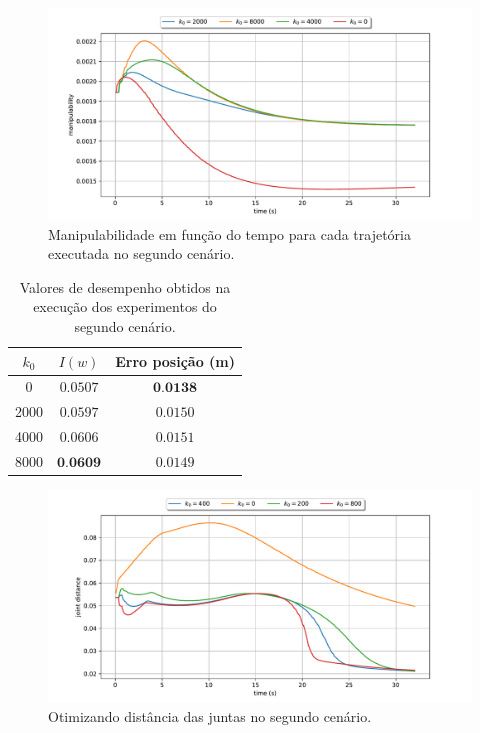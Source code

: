 \begin{figure}
	\centering
	\includegraphics[width=\textwidth]{./Images/2024-06-11-09-17-48/metric_manipulability.pdf}
	\caption{Manipulabilidade em função do tempo para cada trajetória executada no segundo cenário.}\label{fig:exp2-metric}
\end{figure}

\begin{table}[htbp]
    \centering
    \begin{tabular}{ccc}
        \toprule
        \( k_0 \) & \( I(w) \)  & Erro posição (m) \\
        \midrule
        0  & \( 0.0507 \) & \( \textbf{0.0138} \) \\
        2000  & \( 0.0597 \) & \( 0.0150 \) \\
        4000  & \( 0.0606 \) & \( 0.0151 \) \\
        8000  & \( \textbf{0.0609} \) & \( 0.0149 \) \\
        \bottomrule
    \end{tabular}
    \caption{Valores de desempenho obtidos na execução dos experimentos do segundo cenário.}
    \label{tab:scores-exp2}
\end{table}

\begin{figure}
	\centering
	\includegraphics[width=\textwidth]{./Images/2024-07-02-14-04-38/metric_joint_distance.pdf}
	\caption{Otimizando distância das juntas no segundo cenário.}\label{fig:exp3-metric}
\end{figure}

